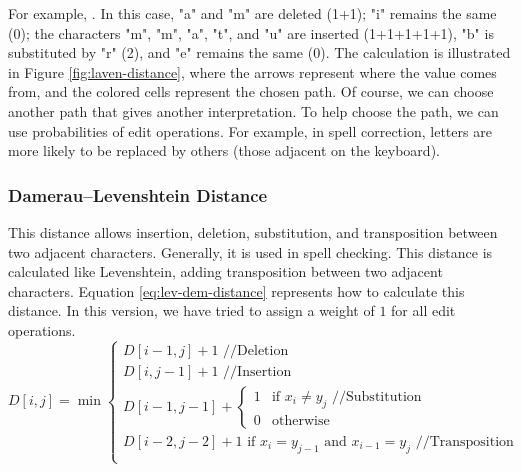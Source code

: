 \documentclass{KBook}
\begin{document}
For example, . In this case, "a" and "m" are deleted (1+1); "i" remains the same (0); the characters "m", "m", "a", "t", and "u" are inserted (1+1+1+1+1), "b" is substituted by "r" (2), and "e" remains the same (0). The calculation is illustrated in Figure \ref{fig:laven-distance}, where the arrows represent where the value comes from, and the colored cells represent the chosen path. Of course, we can choose another path that gives another interpretation. To help choose the path, we can use probabilities of edit operations. For example, in spell correction, letters are more likely to be replaced by others (those adjacent on the keyboard).


\subsubsection{Damerau–Levenshtein Distance}

This distance allows insertion, deletion, substitution, and transposition between two adjacent characters. Generally, it is used in spell checking. This distance is calculated like Levenshtein, adding transposition between two adjacent characters. Equation \ref{eq:lev-dem-distance} represents how to calculate this distance. In this version, we have tried to assign a weight of $1$ for all edit operations.
\begin{equation}
	D[i, j] = \min 
	\begin{cases}
		D[i - 1, j] + 1 \text{ //Deletion}\\
		D[i, j-1] + 1 \text{ //Insertion}\\
		D[i-1, j-1] + \begin{cases}
			1 & \text{if } x_i \ne y_j \text{ //Substitution}\\
			0 & \text{otherwise}
		\end{cases}\\
		D[i-2, j-2] + 1 \text{ if } x_i = y_{j-1} \text{ and } x_{i-1} = y_j \text{ //Transposition}\\
	\end{cases}
	\label{eq:lev-dem-distance}
\end{equation}
\end{document}

